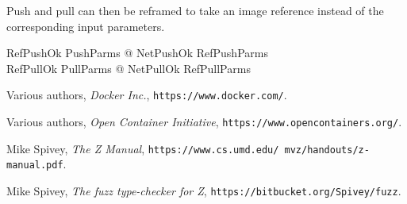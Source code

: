 \documentclass[a4paper,twoside,12pt]{article}
\begin{document}
Push and pull can then be reframed to take an image reference instead of the corresponding input parameters.
\begin{zed}
  RefPushOk  \exists PushParms @ NetPushOk \land RefPushParms \\
  RefPullOk  \exists PullParms @ NetPullOk \land RefPullParms \\
\end{zed}



\clearpage

\appendix

\newpage
\begin{flushleft}
\renewcommand\refname{Bibliography}
\begin{thebibliography}{99}
\label{sec:references}


  Various authors,
  \emph{Docker Inc.},
  \texttt{https://www.docker.com/}.

  Various authors,
  \emph{Open Container Initiative},
  \texttt{https://www.opencontainers.org/}.

  Mike Spivey,
  \emph{The Z Manual},
  \texttt{https://www.cs.umd.edu/ mvz/handouts/z-manual.pdf}.

  Mike Spivey,
  \emph{The fuzz type-checker for Z},
  \texttt{https://bitbucket.org/Spivey/fuzz}.


\end{thebibliography}
\end{flushleft}

\newpage

\end{document}
